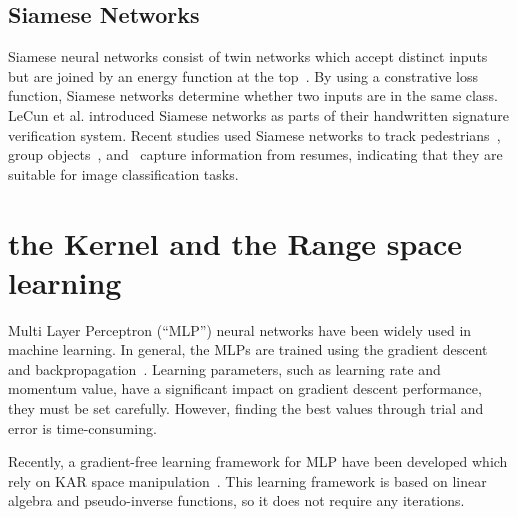 \subsection{Siamese Networks}
Siamese neural networks consist of twin networks which accept distinct inputs but are joined by an energy function at the top~\cite{koch2015siamese}. By using a constrative loss function, Siamese networks determine whether two inputs are in the same class.
LeCun et al. introduced Siamese networks as parts of their handwritten signature verification system.
Recent studies used Siamese networks to track pedestrians~\cite{Leal-Taixe_2016_CVPR_Workshops}, group objects~\cite{mukherjee2018object}, and~\cite{maheshwary2018matching} capture information from resumes, indicating that they are suitable for image classification tasks.

\section{the Kernel and the Range space learning}
Multi Layer Perceptron (``MLP'') neural networks have been widely used in machine learning. In general, the MLPs are trained using the gradient descent and backpropagation~\cite{goodfellow2016deep}.
Learning parameters, such as learning rate and momentum value, have a significant impact on gradient descent performance, they must be set carefully.
However, finding the best values through trial and error is time-consuming.

Recently, a gradient-free learning framework for MLP have been developed which rely on KAR space manipulation~\cite{toh2018analytic,toh100,toh2018learning,toh2018gradient}.
This learning framework is based on linear algebra and pseudo-inverse functions, so it does not require any iterations.

